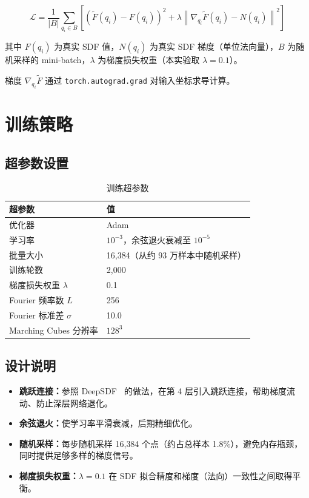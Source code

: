 \documentclass[12pt, a4paper]{article}
\begin{document}
\begin{equation}
  \mathcal{L} = \frac{1}{|B|}\sum_{q_i \in B} \left[
    \left(\tilde{F}(q_i) - F(q_i)\right)^2
    + \lambda \left\|\nabla_{q_i}\tilde{F}(q_i) - N(q_i)\right\|^2
  \right]
\end{equation}

其中 $F(q_i)$ 为真实 SDF 值，$N(q_i)$ 为真实 SDF 梯度（单位法向量），$B$ 为随机采样的 mini-batch，$\lambda$ 为梯度损失权重（本实验取 $\lambda = 0.1$）。

梯度 $\nabla_{q_i}\tilde{F}$ 通过 \texttt{torch.autograd.grad} 对输入坐标求导计算。

\section{训练策略}

\subsection{超参数设置}

\begin{table}[H]
  \centering
  \caption{训练超参数}
  \begin{tabular}{ll}
    \toprule
    超参数 & 值 \\
    \midrule
    优化器 & Adam \\
    学习率 & $10^{-3}$，余弦退火衰减至 $10^{-5}$ \\
    批量大小 & 16{,}384（从约 93 万样本中随机采样） \\
    训练轮数 & 2{,}000 \\
    梯度损失权重 $\lambda$ & 0.1 \\
    Fourier 频率数 $L$ & 256 \\
    Fourier 标准差 $\sigma$ & 10.0 \\
    Marching Cubes 分辨率 & $128^3$ \\
    \bottomrule
  \end{tabular}
\end{table}

\subsection{设计说明}

\begin{itemize}
  \item \textbf{跳跃连接：}参照 DeepSDF~\cite{deepsdf2019} 的做法，在第 4 层引入跳跃连接，帮助梯度流动、防止深层网络退化。
  \item \textbf{余弦退火：}使学习率平滑衰减，后期精细优化。
  \item \textbf{随机采样：}每步随机采样 16{,}384 个点（约占总样本 1.8\%），避免内存瓶颈，同时提供足够多样的梯度信号。
  \item \textbf{梯度损失权重：}$\lambda = 0.1$ 在 SDF 拟合精度和梯度（法向）一致性之间取得平衡。
\end{itemize}
\end{document}
